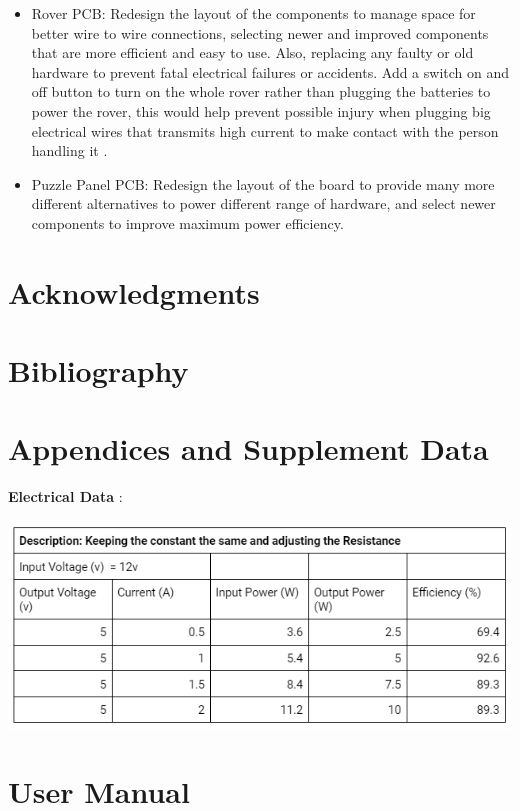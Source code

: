 \documentclass[a4paper, 10pt]{article}
\begin{document}
\begin{itemize}
\item
Rover PCB: Redesign the layout of the components to manage space for better wire to wire connections, selecting newer and improved components that are more efficient and easy to use. Also, replacing any faulty or old hardware to prevent fatal electrical failures or accidents. Add a switch on and off button to turn on the whole rover rather than plugging the batteries to power the rover, this would help prevent possible injury when plugging big electrical wires that transmits high current to make contact with the person handling it
.

\item
Puzzle Panel PCB: Redesign the layout of the board to provide many more different alternatives to power different range of hardware, and select newer components to improve maximum power efficiency.

\end{itemize}

\section{Acknowledgments}

\section{Bibliography} 

\section{Appendices and Supplement Data}  

\textbf{Electrical Data} :

\includegraphics[scale=1.0]{Photos/Buck Converter Data}


\section{User Manual}
\end{document}

